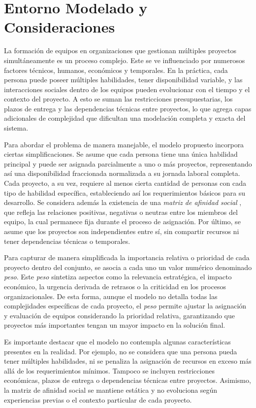 \documentclass[conference]{IEEEtran}
\begin{document}
\section{Entorno Modelado y Consideraciones}

La formación de equipos en organizaciones que gestionan múltiples proyectos simultáneamente es un proceso complejo. Este se ve influenciado por numerosos factores técnicos, humanos, económicos y temporales. En la práctica, cada persona puede poseer múltiples habilidades, tener disponibilidad variable, y las interacciones sociales dentro de los equipos pueden evolucionar con el tiempo y el contexto del proyecto. A esto se suman las restricciones presupuestarias, los plazos de entrega y las dependencias técnicas entre proyectos, lo que agrega capas adicionales de complejidad que dificultan una modelación completa y exacta del sistema.

Para abordar el problema de manera manejable, el modelo propuesto incorpora ciertas simplificaciones. Se asume que cada persona tiene una única habilidad principal y puede ser asignada parcialmente a uno o más proyectos, representando así una disponibilidad fraccionada normalizada a su jornada laboral completa. Cada proyecto, a su vez, requiere al menos cierta cantidad de personas con cada tipo de habilidad específica, estableciendo así los requerimientos básicos para su desarrollo. Se considera además la existencia de una \textit{matriz de afinidad social} \cite{gutierrez2016multiple}, que refleja las relaciones positivas, negativas o neutras entre los miembros del equipo, la cual permanece fija durante el proceso de asignación. Por último, se asume que los proyectos son independientes entre sí, sin compartir recursos ni tener dependencias técnicas o temporales.

Para capturar de manera simplificada la importancia relativa o prioridad de cada proyecto dentro del conjunto, se asocia a cada uno un valor numérico denominado \textit{peso}. Este \textit{peso} sintetiza aspectos como la relevancia estratégica, el impacto económico, la urgencia derivada de retrasos o la criticidad en los procesos organizacionales. De esta forma, aunque el modelo no detalla todas las complejidades específicas de cada proyecto, el \textit{peso} permite ajustar la asignación y evaluación de equipos considerando la prioridad relativa, garantizando que proyectos más importantes tengan un mayor impacto en la solución final.

Es importante destacar que el modelo no contempla algunas características presentes en la realidad. Por ejemplo, no se considera que una persona pueda tener múltiples habilidades, ni se penaliza la asignación de recursos en exceso más allá de los requerimientos mínimos. Tampoco se incluyen restricciones económicas, plazos de entrega o dependencias técnicas entre proyectos. Asimismo, la matriz de afinidad social se mantiene estática y no evoluciona según experiencias previas o el contexto particular de cada proyecto.
\end{document}
